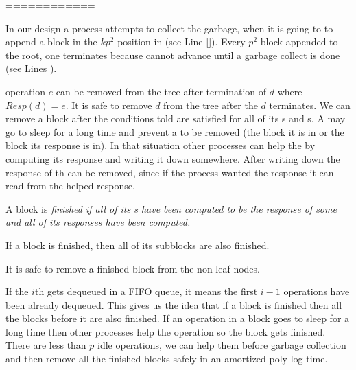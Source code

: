 ============

In our design a process attempts to collect the garbage, when it is going to to append a block in the $kp^2$ position in  (see Line \ref{}). Every $p^2$  block appended to the root, one  terminates because  cannot advance until a  garbage collect is done (see Lines ).

%

 operation $e$ can be removed from the tree after termination of  $d$ where $Resp(d)=e$. It is safe to remove  $d$ from the tree after the $d$ terminates. We can remove a block after the conditions told are satisfied for all of its s and s. A  may go to sleep for a long time and prevent a  to be removed (the block it is in or the block its response is in). In that situation other processes can help the  by computing its response and writing it down somewhere. After writing down the response of th  can be removed, since if the process wanted the response it can read from the helped response.

\begin{definition}
A block  is \it{finished} if all of its s have been computed to be the response of some  and all of its  responses have been computed.  
\end{definition}

\begin{corollary}
If a block is finished, then all of its subblocks are also finished.  
\end{corollary}

\begin{lemma}
It is safe to remove a finished block from the non-leaf nodes.
\end{lemma}

If the $i$th  gets dequeued in a FIFO queue, it means the first $i-1$  operations have been already dequeued. This gives us the idea that if a block is finished then all the blocks before it are also finished. If an operation in a block goes to sleep for a long time then other processes help the operation so the block gets finished. There are less than $p$ idle operations, we can help them before garbage collection and then remove all the finished blocks safely in an amortized poly-log time.

